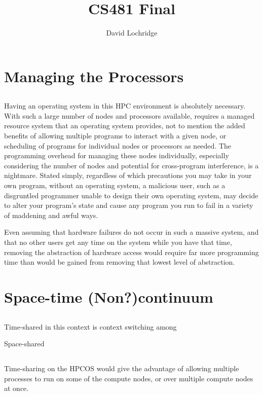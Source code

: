 \documentclass{article}
\title{CS481 Final}
\author{David Lochridge}
\begin{document}
\section{}
\section*{Managing the Processors}
\subsection{}
Having an operating system in this HPC environment is absolutely necessary. With such a large number of nodes and processors available, requires a managed resource system that an operating system provides, not to mention the added benefits of allowing multiple programs to interact with a given node, or scheduling of programs for individual nodes or processors as needed. The programming overhead for managing these nodes individually, especially considering the number of nodes and potential for cross-program interference, is a nightmare. Stated simply, regardless of which precautions you may take in your own program, without an operating system, a malicious user, such as a disgruntled programmer unable to design their own operating system, may decide to alter your program's state and cause any program you run to fail in a variety of maddening and awful ways.

Even assuming that hardware failures do not occur in such a massive system, and that no other users get any time on the system while you have that time, removing the abstraction of hardware access would require far more programming time than would be gained from removing that lowest level of abstraction.

\section*{Space-time (Non?)continuum}
\subsection{}
Time-shared in this context is context switching among 

Space-shared

\subsection{}
Time-sharing on the HPCOS would give the advantage of allowing multiple processes to run on some of the compute nodes, or over multiple compute nodes at once.
\end{document}
